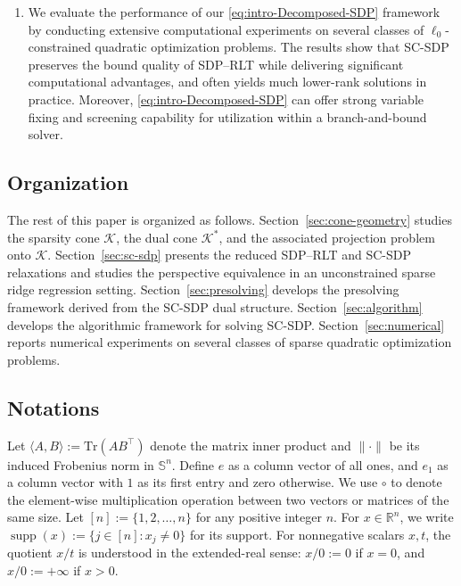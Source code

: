 \documentclass[11pt]{article}
\def\Tr{\mathrm{Tr}}
\def\K{\mathcal{K}}
\def\R{\mathbb{R}}
\def\S{\mathbb{S}}
\theoremstyle{plain}
\begin{document}
\begin{enumerate}[leftmargin=*, itemsep=2pt, topsep=4pt]
    \item We evaluate the performance of our \eqref{eq:intro-Decomposed-SDP} framework by
    conducting extensive computational experiments on several classes of $\ell_0$-constrained quadratic optimization problems. The results show that SC-SDP preserves the bound quality of SDP--RLT while delivering significant computational advantages, and often yields much lower-rank solutions in practice. Moreover, 
    \eqref{eq:intro-Decomposed-SDP} can offer strong variable fixing and 
    screening capability for utilization within a branch-and-bound
    solver. 
\end{enumerate}

\subsection{Organization}

The rest of this paper is organized as follows. Section~\ref{sec:cone-geometry} studies the sparsity cone $\K$, the dual cone $\K^*$, and the associated projection problem onto $\K$. Section~\ref{sec:sc-sdp} presents the reduced SDP--RLT and SC-SDP relaxations and studies the perspective equivalence in an unconstrained sparse ridge regression setting. Section~\ref{sec:presolving} develops the presolving framework derived from the SC-SDP dual structure. Section~\ref{sec:algorithm} develops the algorithmic framework for solving SC-SDP. Section~\ref{sec:numerical} reports numerical experiments on several classes of sparse quadratic optimization problems.

\subsection{Notations}

Let $\langle A,B\rangle := \Tr\left(AB^\top\right)$ denote the matrix inner product and $\|\cdot\|$ be its induced Frobenius norm in $\S^n$. Define $e$ as a column vector of all ones, and $e_1$ as a column vector with $1$ as its first entry and zero otherwise. We use $\circ$ to denote the element-wise multiplication operation between two vectors or matrices of the same size. Let $[n]:=\{1,2,\ldots,n\}$ for any positive integer $n$. For $x\in\R^n$, we write $\operatorname{supp}(x):=\{j\in[n]:x_j\neq 0\}$ for its support. For nonnegative scalars $x,t$, the quotient $x/t$ is understood in the extended-real sense: $x/0:=0$ if $x=0$, and $x/0:=+\infty$ if $x>0$. 
\end{document}
